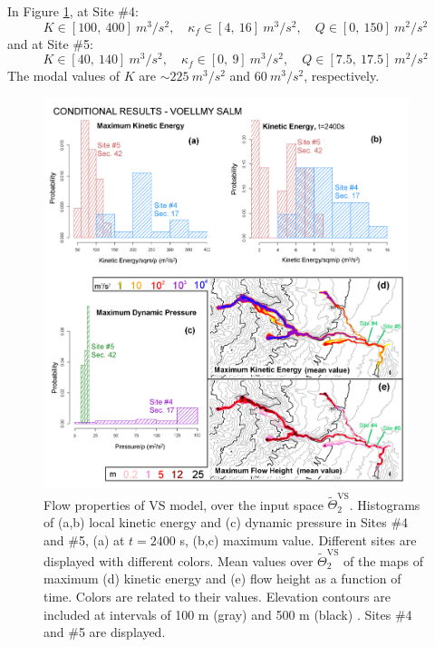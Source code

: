 \documentclass[nhess, manuscript]{copernicus}
\begin{document}
In Figure \ref{Fig12}, at Site \#4:
$$K\in[100,\ 400]\ m^3/s^2,\quad \kappa_f\in[4,\ 16]\ m^3/s^2,\quad Q\in[0,\ 150]\ m^2/s^2$$
and at Site \#5:
$$K\in[40,\ 140]\ m^3/s^2,\quad \kappa_f\in[0,\ 9]\ m^3/s^2,\quad Q\in[7.5,\ 17.5]\ m^2/s^2$$
The modal values of $K$ are $\sim 225\ m^3/s^2$ and $60\ m^3/s^2$, respectively.
\begin{figure}[H]
\centering
\includegraphics[width=0.95\textwidth]{Fig12.png}
\caption{Flow properties of VS model, over the input space $\tilde\Theta_2^{\textrm{VS}}$. Histograms of (a,b) local kinetic energy and (c) dynamic pressure in Sites \#4 and \#5, (a) at $t=2400$ s, (b,c) maximum value. Different sites are displayed with different colors. Mean values over $\tilde\Theta_2^{\textrm{VS}}$ of the maps of maximum (d) kinetic energy and (e) flow height as a function of time. Colors are related to their values. Elevation contours are included at intervals of 100 m (gray) and 500 m (black) \citep{NASA2014}. Sites \#4 and \#5 are displayed.}
\label{Fig12}
\end{figure}
\end{document}
